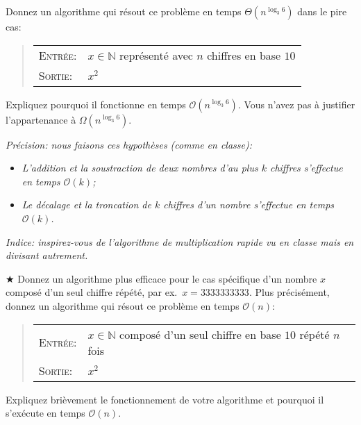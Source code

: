 \documentclass{article}
\newcommand{\avance}{{\large$\bigstar$}}         %
\newcommand{\avancepts}{{\scriptsize$\bigstar$}} %
\newcommand{\N}{\mathbb{N}}                      %
\renewcommand{\O}{\mathcal{O}}                   %
\begin{document}
\begin{question}
  Donnez  un algorithme qui résout ce
  problème en temps $\Theta(n^{\log_3 6})$ dans le pire cas:
  \begin{quote}
    \vspace*{6pt}
    \begin{tabular}{ll}
      \textsc{Entrée}: & $x \in \N$ représenté avec $n$ chiffres en
      base $10$ \\[2pt]
      
      \textsc{Sortie}: & $x^2$
    \end{tabular}
    \vspace*{5pt}
  \end{quote}

  Expliquez pourquoi il fonctionne en temps $\O(n^{\log_3 6})$. Vous
  n'avez pas à justifier l'appartenance à $\Omega(n^{\log_3 6})$.

  \emph{Précision: nous faisons ces hypothèses (comme en
  classe):}\medskip
  \begin{itemize}
    \setlength\itemsep{5pt}
    
  \item \emph{L'addition et la soustraction de deux nombres d'au plus $k$
    chiffres s'effectue en temps $\O(k)$;}

  \item \emph{Le décalage et la troncation de $k$ chiffres d'un nombre
    s'effectue en temps $\O(k)$.}
  \end{itemize}\bigskip

  \emph{Indice: inspirez-vous de l'algorithme de multiplication rapide
    vu en classe mais en divisant autrement.}

  \vspace*{1.5cm}
  
  \avance{} Donnez \marginpar{\avancepts{} \addbonus{3}} un algorithme
  plus efficace pour le cas spécifique d'un nombre $x$ composé d'un
  seul chiffre répété, par ex.\ $x = 3333 3333 33$. Plus précisément,
  donnez un algorithme qui résout ce problème en temps $\O(n)$:
  \begin{quote}
    \vspace*{6pt}
    \begin{tabular}{ll}
      \textsc{Entrée}: & $x \in \N$ composé d'un seul chiffre en
      base $10$ répété $n$ fois \\[2pt]
      
      \textsc{Sortie}: & $x^2$
    \end{tabular}
    \vspace*{5pt}
  \end{quote}  
  Expliquez brièvement le fonctionnement de votre algorithme et
  pourquoi il s'exécute en temps $\O(n)$.
\end{question}
\end{document}
